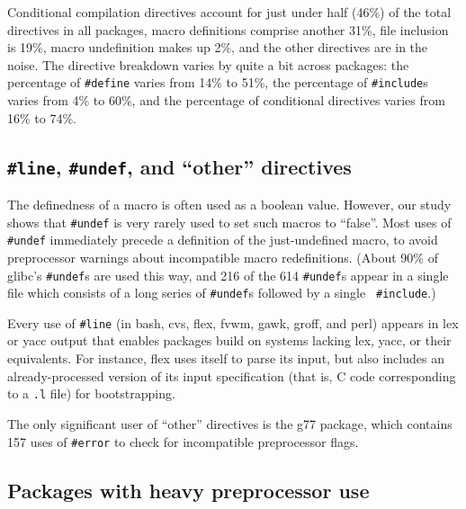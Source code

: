 \documentclass[11pt]{article}
\begin{document}


Conditional compilation directives account for just under half (46\%) of
the total directives in all packages, macro definitions comprise another
31\%, file inclusion is 19\%, macro undefinition makes up 2\%, and the
other directives are in the noise.  The directive breakdown varies by quite
a bit across packages: the percentage of {\tt \#define} varies from 14\% to
51\%, the percentage of {\tt \#include}s varies from 4\% to 60\%, and the
percentage of conditional directives varies from 16\% to 74\%.



\subsection{{\tt \#line}, {\tt \#undef}, and ``other'' directives}

The definedness of a macro is often used as a boolean value.  However, our
study shows that {\tt \#undef} is very rarely used to set such macros to
``false''.  Most uses of {\tt \#undef} immediately precede a definition of
the just-undefined macro, to avoid preprocessor warnings about incompatible
macro redefinitions.  (About 90\% of glibc's {\tt \#undef}s are used this
way, and 216 of the 614 {\tt \#undef}s appear in a single file which
consists of a long series of {\tt \#undef}s followed by a single {\tt
\#include}.)

Every use of {\tt \#line} (in bash, cvs, flex, fvwm, gawk, groff, and perl)
appears in lex or yacc output that enables packages build on systems
lacking lex, yacc, or their equivalents.  For instance, flex uses itself to
parse its input, but also includes an already-processed version of its
input specification (that is, C code corresponding to a {\tt .l} file) for
bootstrapping.

The only significant user of ``other'' directives is the g77 package, which
contains 157 uses of {\tt \#error} to check for incompatible preprocessor
flags.


\subsection{Packages with heavy preprocessor use}
\end{document}
